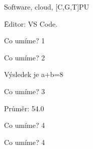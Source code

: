 \documentclass{beamer}
\begin{document}
\begin{frame}{Software, cloud, [C,G,T]PU}

    \={Editor: VS Code.}
    
\end{frame}


\begin{frame}{Co umíme? 1}







\end{frame}



\begin{frame}{Co umíme? 2}
 
    
    \bigskip
    
    Výsledek je a+b=8
    
\end{frame}


\begin{frame}{Co umíme? 3}
 
    
    \bigskip
    
    Průměr: 54.0
    
\end{frame}


\begin{frame}{Co umíme? 4}
 
    
\end{frame}


\begin{frame}{Co umíme? 4}
 
    
\end{frame}
\end{document}
